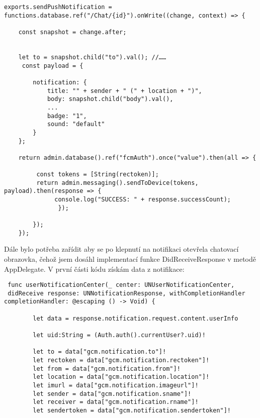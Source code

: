 \documentclass{article}
\begin{document}
\begin{verbatim}
exports.sendPushNotification = functions.database.ref("/Chat/{id}").onWrite((change, context) => {
	
    const snapshot = change.after;


    let to = snapshot.child("to").val(); //……
	 const payload = {
    
		notification: {
			title: "" + sender + " (" + location + ")",
			body: snapshot.child("body").val(),
			...
          	badge: "1",
			sound: "default"
		}
	};
    
	return admin.database().ref("fcmAuth").once("value").then(all => {
        
         const tokens = [String(rectoken)];
  	     return admin.messaging().sendToDevice(tokens, payload).then(response => {
    	      console.log("SUCCESS: " + response.successCount);
      		   });
        
		}); 
	}); 

\end{verbatim}









\vspace{10 mm}
Dále bylo potřeba zařídit aby se po klepnutí na notifikaci otevřela chatovací obrazovka, čehož jsem dosáhl implementací funkce DidReceiveResponse v metodě AppDelegate. V první části kódu získám data z notifikace:

\vspace{10 mm}
\begin{verbatim}
 func userNotificationCenter(_ center: UNUserNotificationCenter,
 didReceive response: UNNotificationResponse, withCompletionHandler completionHandler: @escaping () -> Void) {
       
        let data = response.notification.request.content.userInfo
        
        let uid:String = (Auth.auth().currentUser?.uid)!
        
        let to = data["gcm.notification.to"]!
        let rectoken = data["gcm.notification.rectoken"]!
        let from = data["gcm.notification.from"]!
        let location = data["gcm.notification.location"]!
        let imurl = data["gcm.notification.imageurl"]!
        let sender = data["gcm.notification.sname"]!
        let receiver = data["gcm.notification.rname"]!
        let sendertoken = data["gcm.notification.sendertoken"]!
        \end{verbatim}
        
\end{document}

